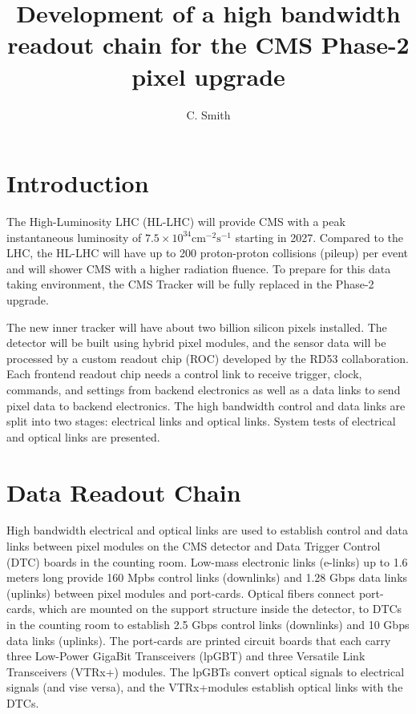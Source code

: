 \documentclass[a4paper,11pt]{article}
\title{Development of a high bandwidth readout chain for the CMS Phase-2 pixel upgrade}
\author{C. Smith}
\affiliation{The University of Kansas,\\Lawrence, Kansas 66045, USA}
\newcommand{\vtrx}{VTRx+}
\begin{document}
\maketitle
\flushbottom


\section{Introduction}
\label{sec:introduction}

The High-Luminosity LHC (HL-LHC) will provide CMS with a peak instantaneous luminosity of $7.5 \times 10^{34} \mathrm{cm}^{-2} \mathrm{s}^{-1}$ starting in 2027.
Compared to the LHC, the HL-LHC will have up to 200 proton-proton collisions (pileup) per event and will shower CMS with a higher radiation fluence.
To prepare for this data taking environment, the CMS Tracker will be fully replaced in the Phase-2 upgrade.

The new inner tracker will have about two billion silicon pixels installed.
The detector will be built using hybrid pixel modules, and the sensor data will be processed by a custom readout chip (ROC) developed by the RD53 collaboration.
Each frontend readout chip needs a control link to receive trigger, clock, commands, and settings from backend electronics as well as a data links to send pixel data to backend electronics.
The high bandwidth control and data links are split into two stages: electrical links and optical links.
System tests of electrical and optical links are presented.

\section{Data Readout Chain}
\label{sec:readout}

High bandwidth electrical and optical links are used to establish control and data links between pixel modules on the CMS detector and Data Trigger Control (DTC) boards in the counting room.
Low-mass electronic links (e-links) up to 1.6 meters long provide 160 Mpbs control links (downlinks) and 1.28 Gbps data links (uplinks) between pixel modules and port-cards.
Optical fibers connect port-cards, which are mounted on the support structure inside the detector, to DTCs in the counting room to establish 2.5 Gbps control links (downlinks) and 10 Gbps data links (uplinks).
The port-cards are printed circuit boards that each carry three Low-Power GigaBit Transceivers (lpGBT) and three Versatile Link Transceivers (\vtrx) modules.
The lpGBTs convert optical signals to electrical signals (and vise versa), and the \vtrx\space modules establish optical links with the DTCs.
\end{document}
